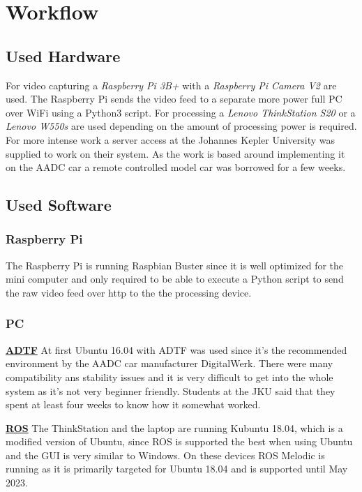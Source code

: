 \chapter{Workflow}

\section{Used Hardware\authorA}
For video capturing a \textit{Raspberry Pi 3B+} with a \textit{Raspberry Pi Camera V2} are used. The Raspberry Pi sends the video feed to a separate more power full PC over WiFi using a Python3 script. \newline
For processing a \textit{Lenovo ThinkStation S20} or a \textit{Lenovo W550s} are used depending on the amount of processing power is required. For more intense work a server access at the Johannes Kepler University was supplied to work on their system. \newline
As the work is based around implementing it on the AADC car a remote controlled model car was borrowed for a few weeks.

\section{Used Software\authorA}
\subsection{Raspberry Pi}
The Raspberry Pi is running Raspbian Buster since it is well optimized for the mini computer and only required to be able to execute a Python script to send the raw video feed over http to the the processing device.
\subsection{PC}
\textbf{\underline{ADTF}} \newline
At first Ubuntu 16.04 with ADTF was used since it's the recommended environment by the AADC car manufacturer DigitalWerk. There were many compatibility ans stability issues and it is very difficult to get into the whole system as it's not very beginner friendly. Students at the JKU said that they spent at least four weeks to know how it somewhat worked.

\textbf{\underline{ROS}} \newline
The ThinkStation and the laptop are running Kubuntu 18.04, which is a modified version of Ubuntu, since ROS is supported the best when using Ubuntu and the GUI is very similar to Windows. On these devices ROS Melodic is running as it is primarily targeted for Ubuntu 18.04 and is supported until May 2023.

